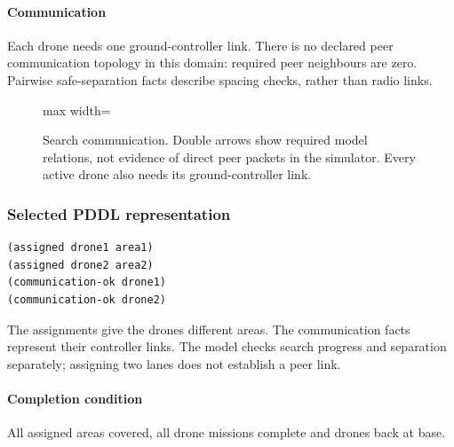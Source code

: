 \documentclass[11pt,a4paper,oneside]{report}
\begin{document}
\paragraph{Communication}
Each drone needs one ground-controller link. There is no declared peer communication topology in this domain: required peer neighbours are zero. Pairwise safe-separation facts describe spacing checks, rather than radio links.

\begin{figure}[H]
\centering
\begin{adjustbox}{max width=\linewidth}
\end{adjustbox}
\caption[Search communication]{Search communication. Double arrows show required model
relations, not evidence of direct peer packets in the simulator. Every active drone
also needs its ground-controller link.}
\label{fig:comm-search}
\end{figure}
\subsubsection*{Selected PDDL representation}
\begin{lstlisting}
(assigned drone1 area1)
(assigned drone2 area2)
(communication-ok drone1)
(communication-ok drone2)
\end{lstlisting}
The assignments give the drones different areas. The communication facts represent their controller links. The model checks search progress and separation separately; assigning two lanes does not establish a peer link.

\paragraph{Completion condition}
All assigned areas covered, all drone missions complete and drones back at base.
\end{document}

